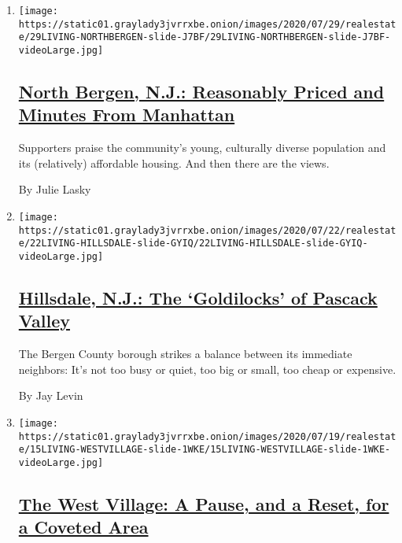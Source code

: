 \begin{enumerate}
\def\labelenumi{\arabic{enumi}.}
\item
  \texttt{[image: https://static01.graylady3jvrrxbe.onion/images/2020/07/29/realestate/29LIVING-NORTHBERGEN-slide-J7BF/29LIVING-NORTHBERGEN-slide-J7BF-videoLarge.jpg]}

  \hypertarget{north-bergen-nj-reasonably-priced-and-minutes-from-manhattan}{%
  \subsection{\texorpdfstring{\href{/2020/07/29/realestate/north-bergen-nj-reasonably-priced-and-minutes-from-manhattan.html}{North
  Bergen, N.J.: Reasonably Priced and Minutes From
  Manhattan}}{North Bergen, N.J.: Reasonably Priced and Minutes From Manhattan}}\label{north-bergen-nj-reasonably-priced-and-minutes-from-manhattan}}

  Supporters praise the community's young, culturally diverse population
  and its (relatively) affordable housing. And then there are the views.

  By Julie Lasky
\item
  \texttt{[image: https://static01.graylady3jvrrxbe.onion/images/2020/07/22/realestate/22LIVING-HILLSDALE-slide-GYIQ/22LIVING-HILLSDALE-slide-GYIQ-videoLarge.jpg]}

  \hypertarget{hillsdale-nj-the-goldilocks-of-pascack-valley}{%
  \subsection{\texorpdfstring{\href{/2020/07/22/realestate/hillsdale-nj-pascack-valley.html}{Hillsdale,
  N.J.: The `Goldilocks' of Pascack
  Valley}}{Hillsdale, N.J.: The `Goldilocks' of Pascack Valley}}\label{hillsdale-nj-the-goldilocks-of-pascack-valley}}

  The Bergen County borough strikes a balance between its immediate
  neighbors: It's not too busy or quiet, too big or small, too cheap or
  expensive.

  By Jay Levin
\item
  \texttt{[image: https://static01.graylady3jvrrxbe.onion/images/2020/07/19/realestate/15LIVING-WESTVILLAGE-slide-1WKE/15LIVING-WESTVILLAGE-slide-1WKE-videoLarge.jpg]}

  \hypertarget{the-west-village-a-pause-and-a-reset-for-a-coveted-area}{%
  \subsection{\texorpdfstring{\href{/2020/07/15/realestate/west-village-nyc.html}{The
  West Village: A Pause, and a Reset, for a Coveted
  Area}}{The West Village: A Pause, and a Reset, for a Coveted Area}}\label{the-west-village-a-pause-and-a-reset-for-a-coveted-area}}


\end{enumerate}
